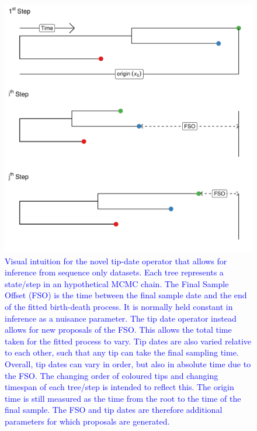 \documentclass{article}
\begin{document}
\begin{figure}[H]
\centering
\includegraphics[width=1\linewidth]{../figures/tipDateOp.pdf}
\caption{\textcolor{blue}{Visual intuition for the novel tip-date operator that allows for inference from sequence only datasets. Each tree represents a state/step in an hypothetical MCMC chain. The Final Sample Offset (FSO) is the time between the final sample date and the  end of the fitted birth-death process. It is normally held constant in inference as a nuisance parameter. The tip date operator instead allows for new proposals of the FSO. This allows the total time taken for the fitted process to vary. Tip dates are also varied relative to each other, such that any tip can take the final sampling time. Overall, tip dates can vary in order, but also in absolute time due to the FSO. The changing order of coloured tips and changing timespan of each tree/step is intended to reflect this. The origin time is still measured as the time from the root to the time of the final sample.  The FSO and tip dates are therefore additional parameters for which proposals are generated.}}
\label{fig:tipOp}
\end{figure}
\end{document}
